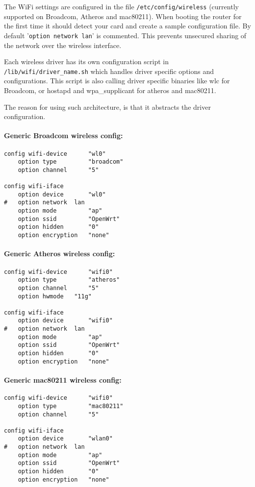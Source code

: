 The WiFi settings are configured in the file \texttt{/etc/config/wireless}
(currently supported on Broadcom, Atheros and mac80211). When booting the router for the first time
it should detect your card and create a sample configuration file. By default '\texttt{option network  lan}' is
commented. This prevents unsecured sharing of the network over the wireless interface.

Each wireless driver has its own configuration script in \texttt{/lib/wifi/driver\_name.sh} which handles
driver specific options and configurations. This script is also calling driver specific binaries like wlc for
Broadcom, or hostapd and wpa\_supplicant for atheros and mac80211.

The reason for using such architecture, is that it abstracts the driver configuration. 

\paragraph{Generic Broadcom wireless config:}

\begin{Verbatim}
config wifi-device      "wl0"
    option type         "broadcom"
    option channel      "5"

config wifi-iface
    option device       "wl0"
#   option network  lan
    option mode         "ap"
    option ssid         "OpenWrt"
    option hidden       "0"
    option encryption   "none"
\end{Verbatim}

\paragraph{Generic Atheros wireless config:}

\begin{Verbatim}
config wifi-device      "wifi0"
    option type         "atheros"
    option channel      "5"
    option hwmode	"11g"

config wifi-iface
    option device       "wifi0"
#   option network  lan
    option mode         "ap"
    option ssid         "OpenWrt"
    option hidden       "0"
    option encryption   "none"
\end{Verbatim}

\paragraph{Generic mac80211 wireless config:}

\begin{Verbatim}
config wifi-device      "wifi0"
    option type         "mac80211"
    option channel      "5"

config wifi-iface
    option device       "wlan0"
#   option network  lan
    option mode         "ap"
    option ssid         "OpenWrt"
    option hidden       "0"
    option encryption   "none"
\end{Verbatim}

